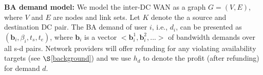 \documentclass[sigconf]{acmart}
\begin{document}
\textbf{BA demand model:}
We model the inter-DC WAN as a  graph $G=(V,E)$,  where $V$ and $E$ are nodes and link sets.
Let $K$ denote the a source and destination DC pair.
The BA demand of user $i$, i.e., $d_i$, can be presented as $(\mathbf{b}_i, \beta_i,t_s,t_e)$,
where $\mathbf{b}_i$ is a vector $<\mathbf{b}_i^1, \mathbf{b}_i^2, ...>$ of bandwidth demands over all s-d pairs.
Network providers will offer refunding for any violating availability targets (see $\S$\ref{background}) and we use $h_d$ to denote the profit (after refunding) for demand $d$.

\end{document}
